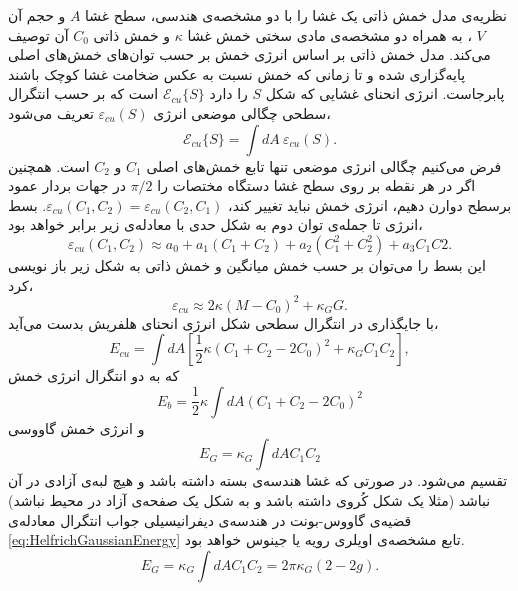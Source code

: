نظریه‌ی مدل خمش ذاتی  
یک غشا را با دو مشخصه‌ی هندسی، سطح غشا 
$A$
و حجم آن 
$V$
، به همراه دو مشخصه‌ی مادی  
سختی خمش غشا
$\kappa$
و خمش ذاتی 
$C_0$
آن توصیف می‌کند. مدل خمش ذاتی بر اساس انرژی خمش بر حسب توان‌های خمش‌های اصلی پایه‌گزاری شده و تا زمانی که خمش نسبت به عکس ضخامت غشا کوچک باشند پابرجاست.
انرژی انحنای غشایی که شکل 
$S$
را دارد 
$\mathcal{E}_{cu}\{S\}$
است که بر حسب انتگرال سطحی چگالی موضعی انرژی 
$\varepsilon_{cu}(S)$
تعریف می‌شود،
\begin{equation}
\mathcal{E}_{cu}\{S\}=\int dA~\varepsilon_{cu}(S).
\end{equation}
فرض می‌کنیم چگالی انرژی موضعی تنها تابع خمش‌های اصلی 
$C_1$
و
$C_2$
است. همچنین اگر در هر نقطه بر روی سطح غشا دستگاه مختصات را 
$\pi/2$
در جهات بردار عمود برسطح دوارن دهیم، انرژی خمش نباید تغییر کند،
$\varepsilon_{cu}(C_1,C_2)=\varepsilon_{cu}(C_2,C_1)$.
بسط انرژی تا جمله‌ی توان دوم به شکل حدی با معادله‌ی زیر برابر خواهد بود،
\begin{equation}
\varepsilon_{cu}(C_1,C_2)\approx a_0+a_1(C_1+C_2)+a_2(C_1^2+C_2^2) + a_3 C_1C2.
\end{equation}
این بسط را می‌توان بر حسب خمش میانگین و خمش ذاتی به شکل زیر باز نویسی کرد،
\begin{equation}
\varepsilon_{cu}\approx 2\kappa(M-C_0)^2+\kappa_GG.
\end{equation}
با جایگذاری در انتگرال سطحی شکل انرژی انحنای هلفریش
\cite{Helfrich1973}
بدست می‌آید،
\begin{equation}
E_{cu}=\int dA\left[\frac{1}{2}\kappa(C_1+C_2-2C_0)^2+\kappa_GC_1C_2\right],
\label{eq:HelfrichCurvatureEnergy}
\end{equation}
که به دو انتگرال انرژی خمش 
\begin{equation}
E_{b}=\frac{1}{2}\kappa\int dA (C_1+C_2-2C_0)^2
\label{eq:HelfrichBendingEnergy}
\end{equation}
و انرژی خمش گاووسی
\begin{equation}
E_{G}=\kappa_G\int dA C_1C_2
\label{eq:HelfrichGaussianEnergy}
\end{equation}
تقسیم می‌شود.
در صورتی که غشا هندسه‌ی بسته داشته باشد و هیچ لبه‌ی آزادی در آن نباشد (مثلا یک شکل کُروی داشته باشد و به شکل یک صفحه‌ی آزاد در محیط نباشد) قضیه‌ی گاووس-بونت
\cite{NelsonBook2004}
در هندسه‌ی دیفرانیسیلی جواب انتگرال معادله‌ی
\ref{eq:HelfrichGaussianEnergy}
 تابع مشخصه‌ی اویلری رویه
 یا جینوس
خواهد بود.
 \begin{equation}
E_{G}=\kappa_G\int dA C_1C_2=2\pi\kappa_G(2-2g).
\label{eq:GaussianBonnet}
\end{equation}
 
